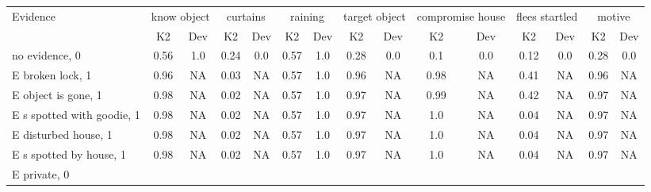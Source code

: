 \begin{table}\begin{tabular}{l|cc|cc|cc|cc|cc|cc|cc}\toprule\multirow{2}{*}{Evidence} & \multicolumn{2}{c}{know object}& \multicolumn{2}{c}{curtains}& \multicolumn{2}{c}{raining}& \multicolumn{2}{c}{target object}& \multicolumn{2}{c}{compromise house}& \multicolumn{2}{c}{flees startled}& \multicolumn{2}{c}{motive}\\& {K2} & {Dev}& {K2} & {Dev}& {K2} & {Dev}& {K2} & {Dev}& {K2} & {Dev}& {K2} & {Dev}& {K2} & {Dev}\\\midrule
no evidence, 0 & \cellcolor{Bittersweet}0.56&\cellcolor{Bittersweet}1.0&\cellcolor{Bittersweet}0.24&\cellcolor{Bittersweet}0.0&\cellcolor{Bittersweet}0.57&\cellcolor{Bittersweet}1.0&\cellcolor{Bittersweet}0.28&\cellcolor{Bittersweet}0.0&\cellcolor{Bittersweet}0.1&\cellcolor{Bittersweet}0.0&\cellcolor{Bittersweet}0.12&\cellcolor{Bittersweet}0.0&\cellcolor{Bittersweet}0.28&\cellcolor{Bittersweet}0.0\\E broken lock, 1 & \cellcolor{Bittersweet}0.96&\cellcolor{Bittersweet}NA&\cellcolor{Bittersweet}0.03&\cellcolor{Bittersweet}NA&\cellcolor{Bittersweet}0.57&\cellcolor{Bittersweet}1.0&\cellcolor{Bittersweet}0.96&\cellcolor{Bittersweet}NA&\cellcolor{Bittersweet}0.98&\cellcolor{Bittersweet}NA&\cellcolor{Bittersweet}0.41&\cellcolor{Bittersweet}NA&\cellcolor{Bittersweet}0.96&\cellcolor{Bittersweet}NA\\E object is gone, 1 & \cellcolor{Bittersweet}0.98&\cellcolor{Bittersweet}NA&\cellcolor{Bittersweet}0.02&\cellcolor{Bittersweet}NA&\cellcolor{Bittersweet}0.57&\cellcolor{Bittersweet}1.0&\cellcolor{Bittersweet}0.97&\cellcolor{Bittersweet}NA&\cellcolor{Bittersweet}0.99&\cellcolor{Bittersweet}NA&\cellcolor{Bittersweet}0.42&\cellcolor{Bittersweet}NA&\cellcolor{Bittersweet}0.97&\cellcolor{Bittersweet}NA\\E s spotted with goodie, 1 & \cellcolor{Bittersweet}0.98&\cellcolor{Bittersweet}NA&\cellcolor{Bittersweet}0.02&\cellcolor{Bittersweet}NA&\cellcolor{Bittersweet}0.57&\cellcolor{Bittersweet}1.0&\cellcolor{Bittersweet}0.97&\cellcolor{Bittersweet}NA&\cellcolor{Bittersweet}1.0&\cellcolor{Bittersweet}NA&\cellcolor{Bittersweet}0.04&\cellcolor{Bittersweet}NA&\cellcolor{Bittersweet}0.97&\cellcolor{Bittersweet}NA\\E disturbed house, 1 & \cellcolor{Bittersweet}0.98&\cellcolor{Bittersweet}NA&\cellcolor{Bittersweet}0.02&\cellcolor{Bittersweet}NA&\cellcolor{Bittersweet}0.57&\cellcolor{Bittersweet}1.0&\cellcolor{Bittersweet}0.97&\cellcolor{Bittersweet}NA&\cellcolor{Bittersweet}1.0&\cellcolor{Bittersweet}NA&\cellcolor{Bittersweet}0.04&\cellcolor{Bittersweet}NA&\cellcolor{Bittersweet}0.97&\cellcolor{Bittersweet}NA\\E s spotted by house, 1 & \cellcolor{Bittersweet}0.98&\cellcolor{Bittersweet}NA&\cellcolor{Bittersweet}0.02&\cellcolor{Bittersweet}NA&\cellcolor{Bittersweet}0.57&\cellcolor{Bittersweet}1.0&\cellcolor{Bittersweet}0.97&\cellcolor{Bittersweet}NA&\cellcolor{Bittersweet}1.0&\cellcolor{Bittersweet}NA&\cellcolor{Bittersweet}0.04&\cellcolor{Bittersweet}NA&\cellcolor{Bittersweet}0.97&\cellcolor{Bittersweet}NA\\E private, 0 & 
\end{tabular}
\end{table}

